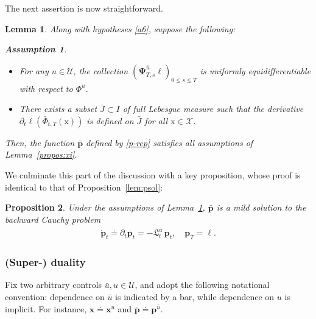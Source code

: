 \documentclass[sn-mathphys-num]{sn-jnl}
\numberwithin{equation}{section}
\theoremstyle{mythm}
\newtheorem{proposition}{Proposition}[section]
\newtheorem{lemma}[proposition]{Lemma}
\theoremstyle{mydef}
\newtheorem{assumption}{Assumption}\renewcommand{\theassumption}{(A\arabic{assumption})}  %
\begin{document}
The next assertion is now straightforward.
\begin{lemma}\label{coro:bmp}
Along with hypotheses \ref{a6}, suppose the following:
\begin{tcolorbox}
\begin{assumption}
\label{A7}~    
\begin{itemize}
\item For any \(u \in \mathcal{U}\), the collection \((\bm{\Psi}_{T,s}^{\bar{u}}\ell)_{0 \leq s \leq T}\) is uniformly equidifferentiable with respect to \(\Phi^u\). 
\item There exists a subset \(\bar{J} \subset I\) of full Lebesgue measure such that the derivative \(\partial_t \ell(\bar{\Phi}_{t,T}(\mathrm{x}))\) is defined on \(\bar{J}\) for all \(\mathrm{x} \in \mathcal{X}\).
\end{itemize}
\end{assumption}
\end{tcolorbox}
Then, the function \(\bar{\bm{p}}\) defined by \eqref{p-rep} satisfies all assumptions of Lemma~\ref{propos:xi}.
\end{lemma}

We culminate this part of the discussion with a key proposition, whose proof is identical to that of Proposition~\ref{lem:psol}:
\begin{proposition}\label{prop:p_ge}
  Under the assumptions of Lemma~\ref{coro:bmp}, \(\bar{\bm{p}}\) is a mild solution to the backward Cauchy problem
\begin{align}\label{p}
    \dot{\bm{p}}_t \doteq \partial_t \bar{\bm{p}}_t = - \mathfrak{L}_t^{\bar u} \, \bm{p}_t, \quad \bm{p}_T = \ell.
\end{align}
\end{proposition}


\subsubsection{(Super-) duality}

Fix two arbitrary controls \( \bar{u}, u \in \mathcal{U} \), and adopt the following notational convention: dependence on \( \bar{u} \) is indicated by a bar, while dependence on \( u \) is implicit. For instance, \( \bm{x} \doteq \bm{x}^u \) and \( \bar{\bm{p}} \doteq \bm{p}^{\bar{u}} \).
\end{document}
